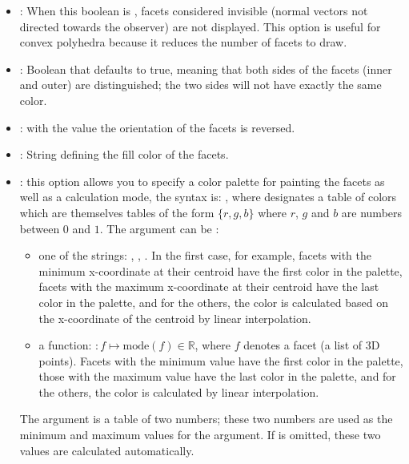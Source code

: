 \begin{enumerate}
\begin{itemize}
        \item {}: When this boolean is \true, facets considered invisible (normal vectors not directed towards the observer) are not displayed. This option is useful for convex polyhedra because it reduces the number of facets to draw.
        
        \item {}: Boolean that defaults to true, meaning that both sides of the facets (inner and outer) are distinguished; the two sides will not have exactly the same color.
        
        \item {} : with the value \true the orientation of the facets is reversed.
        
        \item {}: String defining the fill color of the facets.
        
        \item {}:  this option allows you to specify a color palette for painting the facets as well as a calculation mode, the syntax is: , where  designates a table of colors which are themselves tables of the form $\{r,g,b\}$ where $r$, $g$ and $b$ are numbers between $0$ and $1$. The argument   can be :
        \begin{itemize}
            \item one of the strings: , , . In the first case, for example, facets with the minimum x-coordinate at their centroid have the first color in the palette, facets with the maximum x-coordinate at their centroid have the last color in the palette, and for the others, the color is calculated based on the x-coordinate of the centroid by linear interpolation.
            
            \item a function: $\colon f \mapsto \mathrm{mode}(f)\in\mathbb R$, where $f$ denotes a facet (a list of 3D points). Facets with the minimum value have the first color in the palette, those with the maximum value have the last color in the palette, and for the others, the color is calculated by linear interpolation.
        \end{itemize}
        The  argument is a table of two numbers; these two numbers are used as the minimum and maximum values ​​for the  argument. If  is omitted, these two values ​​are calculated automatically.
    \end{itemize}


\end{enumerate}
